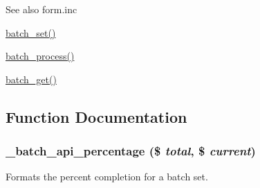 \begin{DoxySeeAlso}{See also}
form.inc 

\hyperlink{group__batch_ga9ff3f18b3bdd1d62ab7ac681a22a7170}{batch\_\-set()} 

\hyperlink{group__batch_gab17f59692632a482cee4f65f27d082f7}{batch\_\-process()} 

\hyperlink{group__batch_ga971f5246c6e8e536d0b20529fb2e2638}{batch\_\-get()} 
\end{DoxySeeAlso}


\subsection{Function Documentation}
\hypertarget{batch_8inc_a0e08303b9f24da1acff2fd1b41a7bc32}{
\subsubsection[{\_\-batch\_\-api\_\-percentage}]{\setlength{\rightskip}{0pt plus 5cm}\_\-batch\_\-api\_\-percentage (\$ {\em total}, \/  \$ {\em current})}}
\label{batch_8inc_a0e08303b9f24da1acff2fd1b41a7bc32}
Formats the percent completion for a batch set.


